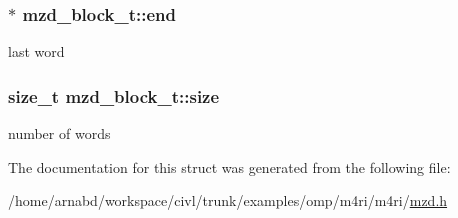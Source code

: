 \subsubsection[{end}]{$\ast$ mzd\+\_\+block\+\_\+t\+::end}\label{structmzd__block__t_a28247ab4c8ed616287ec5daaf8878f96}
last word \hypertarget{structmzd__block__t_a172b39de6b4e23708f9069054a5e5439}{}
\subsubsection[{size}]{\setlength{\rightskip}{0pt plus 5cm}size\+\_\+t mzd\+\_\+block\+\_\+t\+::size}\label{structmzd__block__t_a172b39de6b4e23708f9069054a5e5439}
number of words 

The documentation for this struct was generated from the following file\+:\begin{DoxyCompactItemize}
\item 
/home/arnabd/workspace/civl/trunk/examples/omp/m4ri/m4ri/\hyperlink{mzd_8h}{mzd.\+h}\end{DoxyCompactItemize}
